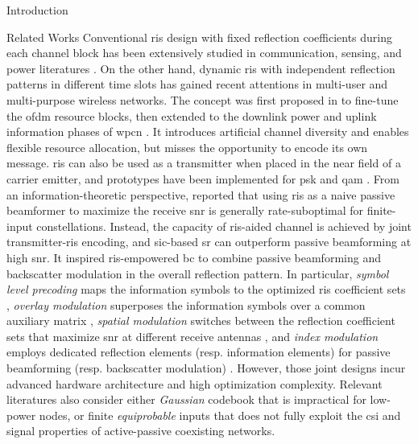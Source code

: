 \documentclass[journal]{IEEEtran}
\begin{document}
\begin{section}{Introduction}
\begin{subsection}{Related Works}
		Conventional \gls{ris} design with fixed reflection coefficients during each channel block has been extensively studied in communication, sensing, and power literatures \cite{Wu2018,Zhang2019a,Lin2022,Liu2022,Feng2022,Zhao2022}.
		On the other hand, dynamic \gls{ris} with independent reflection patterns in different time slots has gained recent attentions in multi-user and multi-purpose wireless networks.
		The concept was first proposed in \cite{Yang2020} to fine-tune the \gls{ofdm} resource blocks, then extended to the downlink power and uplink information phases of \gls{wpcn} \cite{Wu2021,Wu2021d,Hua2022a}.
		It introduces artificial channel diversity and enables flexible resource allocation, but misses the opportunity to encode its own message.
		\gls{ris} can also be used as a transmitter when placed in the near field of a carrier emitter, and prototypes have been implemented for \gls{psk} \cite{Tang2019a} and \gls{qam} \cite{Dai2020a}.
		From an information-theoretic perspective, \cite{Karasik2020} reported that using \gls{ris} as a naive passive beamformer to maximize the receive \gls{snr} is generally rate-suboptimal for finite-input constellations.
		Instead, the capacity of \gls{ris}-aided channel is achieved by joint transmitter-\gls{ris} encoding, and \gls{sic}-based \gls{sr} can outperform passive beamforming at high \gls{snr}.
		It inspired \gls{ris}-empowered \gls{bc} \cite{Liu2019d,Bereyhi2020,Xu2020b,Zhang2021d,Hu2021b,Hua2022,Basar2020,Ma2020a,Yuan2021,Hu2021a} to combine passive beamforming and backscatter modulation in the overall reflection pattern.
		In particular, \emph{symbol level precoding} maps the information symbols to the optimized \gls{ris} coefficient sets \cite{Liu2019d,Bereyhi2020}, \emph{overlay modulation} superposes the information symbols over a common auxiliary matrix \cite{Xu2020b,Zhang2021d,Hu2021b,Hua2022}, \emph{spatial modulation} switches between the reflection coefficient sets that maximize \gls{snr} at different receive antennas \cite{Basar2020,Ma2020a,Yuan2021}, and \emph{index modulation} employs dedicated reflection elements (resp. information elements) for passive beamforming (resp. backscatter modulation) \cite{Hu2021a}.
		However, those joint designs incur advanced hardware architecture and high optimization complexity.
		Relevant literatures also consider either \emph{Gaussian} codebook \cite{Guo2019b,Ding2020,Long2020a,Zhou2019a,Wu2021a,Xu2021a,Yang2021a,Hu2021b} that is impractical for low-power nodes, or finite \emph{equiprobable} inputs \cite{Yang2018,Liang2020,Han2021,Zhang2022,Liu2019d,Bereyhi2020,Xu2020b,Zhang2021d,Hua2022,Basar2020,Ma2020a,Yuan2021,Hu2021a} that does not fully exploit the \gls{csi} and signal properties of active-passive coexisting networks.
	\end{subsection}


\end{section}
\end{document}

